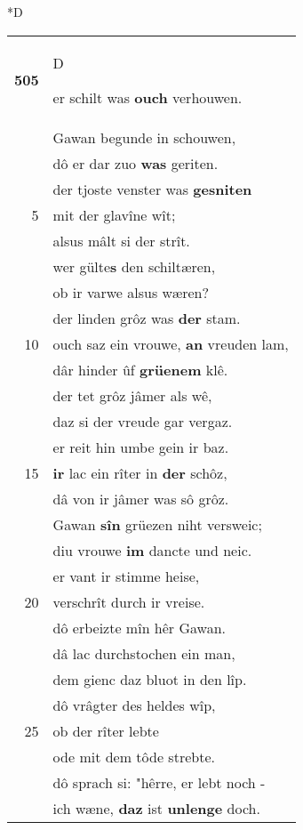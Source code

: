\documentclass[8pt,a4paper,notitlepage]{article}
\begin{document}
\begin{table}[ht]
\begin{minipage}[t]{0.5\linewidth}
\small
\begin{center}*D
\end{center}
\begin{tabular}{rl}
\textbf{505} & \begin{large}D\end{large}er schilt was \textbf{ouch} verhouwen.\\ 
 & Gawan begunde in schouwen,\\ 
 & dô er dar zuo \textbf{was} geriten.\\ 
 & der tjoste venster was \textbf{gesniten}\\ 
5 & mit der glavîne wît;\\ 
 & alsus mâlt si der strît.\\ 
 & wer gülte\textbf{s} den schiltæren,\\ 
 & ob ir varwe alsus wæren?\\ 
 & der linden grôz was \textbf{der} stam.\\ 
10 & ouch saz ein vrouwe, \textbf{an} vreuden lam,\\ 
 & dâr hinder ûf \textbf{grüenem} klê.\\ 
 & der tet grôz jâmer als wê,\\ 
 & daz si der vreude gar vergaz.\\ 
 & er reit hin umbe gein ir baz.\\ 
15 & \textbf{ir} lac ein rîter in \textbf{der} schôz,\\ 
 & dâ von ir jâmer was sô grôz.\\ 
 & Gawan \textbf{sîn} grüezen niht versweic;\\ 
 & diu vrouwe \textbf{im} dancte und neic.\\ 
 & er vant ir stimme heise,\\ 
20 & verschrît durch ir vreise.\\ 
 & dô erbeizte mîn hêr Gawan.\\ 
 & dâ lac durchstochen ein man,\\ 
 & dem gienc daz bluot in den lîp.\\ 
 & dô vrâgter des heldes wîp,\\ 
25 & ob der rîter lebte\\ 
 & ode mit dem tôde strebte.\\ 
 & dô sprach si: "hêrre, er lebt noch -\\ 
 & ich wæne, \textbf{daz} ist \textbf{unlenge} doch.\\ 

\end{tabular}
\end{minipage}
\end{table}
\end{document}

